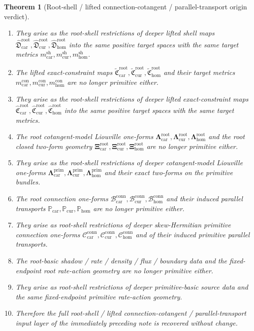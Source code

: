 \documentclass[11pt]{article}
\newcommand{\TensorShellMetric}{m_{\mathrm{car}}^{\mathrm{sh}}}
\newcommand{\CurShellMetric}{m_{\mathrm{cur}}^{\mathrm{sh}}}
\newcommand{\HomShellMetric}{m_{\mathrm{hom}}^{\mathrm{sh}}}
\newcommand{\TensorConstraintMetric}{m_{\mathrm{car}}^{\mathrm{con}}}
\newcommand{\CurConstraintMetric}{m_{\mathrm{cur}}^{\mathrm{con}}}
\newcommand{\HomConstraintMetric}{m_{\mathrm{hom}}^{\mathrm{con}}}
\newcommand{\TensorRootConstraintMap}{\widetilde{\mathfrak C}_{\mathrm{car}}^{\mathrm{root}}}
\newcommand{\CurRootConstraintMap}{\widetilde{\mathfrak C}_{\mathrm{cur}}^{\mathrm{root}}}
\newcommand{\HomRootConstraintMap}{\widetilde{\mathfrak C}_{\mathrm{hom}}^{\mathrm{root}}}
\newcommand{\TensorRootLiouville}{\boldsymbol{\Lambda}_{\mathrm{car}}^{\mathrm{root}}}
\newcommand{\CurRootLiouville}{\boldsymbol{\Lambda}_{\mathrm{cur}}^{\mathrm{root}}}
\newcommand{\HomRootLiouville}{\boldsymbol{\Lambda}_{\mathrm{hom}}^{\mathrm{root}}}
\newcommand{\TensorRootTwo}{\boldsymbol{\Xi}_{\mathrm{car}}^{\mathrm{root}}}
\newcommand{\CurRootTwo}{\boldsymbol{\Xi}_{\mathrm{cur}}^{\mathrm{root}}}
\newcommand{\HomRootTwo}{\boldsymbol{\Xi}_{\mathrm{hom}}^{\mathrm{root}}}
\newcommand{\TensorRootConnectionForm}{\mathcal B_{\mathrm{car}}^{\mathrm{conn}}}
\newcommand{\CurRootConnectionForm}{\mathcal B_{\mathrm{cur}}^{\mathrm{conn}}}
\newcommand{\HomRootConnectionForm}{\mathcal B_{\mathrm{hom}}^{\mathrm{conn}}}
\newcommand{\TensorRootTransport}{\mathbb P_{\mathrm{car}}}
\newcommand{\CurRootTransport}{\mathbb P_{\mathrm{cur}}}
\newcommand{\HomRootTransport}{\mathbb P_{\mathrm{hom}}}
\newcommand{\TensorPrimitiveLiftedShellSection}{\widehat{\mathfrak D}_{\mathrm{car}}^{\mathrm{root}}}
\newcommand{\CurPrimitiveLiftedShellSection}{\widehat{\mathfrak D}_{\mathrm{cur}}^{\mathrm{root}}}
\newcommand{\HomPrimitiveLiftedShellSection}{\widehat{\mathfrak D}_{\mathrm{hom}}^{\mathrm{root}}}
\newcommand{\TensorPrimitiveConstraintMap}{\widehat{\mathfrak C}_{\mathrm{car}}^{\mathrm{root}}}
\newcommand{\CurPrimitiveConstraintMap}{\widehat{\mathfrak C}_{\mathrm{cur}}^{\mathrm{root}}}
\newcommand{\HomPrimitiveConstraintMap}{\widehat{\mathfrak C}_{\mathrm{hom}}^{\mathrm{root}}}
\newcommand{\TensorPrimitiveLiouville}{\boldsymbol{\Lambda}_{\mathrm{car}}^{\mathrm{prim}}}
\newcommand{\CurPrimitiveLiouville}{\boldsymbol{\Lambda}_{\mathrm{cur}}^{\mathrm{prim}}}
\newcommand{\HomPrimitiveLiouville}{\boldsymbol{\Lambda}_{\mathrm{hom}}^{\mathrm{prim}}}
\newcommand{\TensorPrimitiveConnectionForm}{\mathcal C_{\mathrm{car}}^{\mathrm{conn}}}
\newcommand{\CurPrimitiveConnectionForm}{\mathcal C_{\mathrm{cur}}^{\mathrm{conn}}}
\newcommand{\HomPrimitiveConnectionForm}{\mathcal C_{\mathrm{hom}}^{\mathrm{conn}}}
\newtheorem{theorem}{Theorem}
\begin{document}
\begin{theorem}[Root-shell / lifted connection-cotangent / parallel-transport origin verdict]
\begin{enumerate}
    \item They arise as the root-shell restrictions of deeper lifted shell maps \(\TensorPrimitiveLiftedShellSection,\CurPrimitiveLiftedShellSection,\HomPrimitiveLiftedShellSection\) into the same positive target spaces with the same target metrics \(\TensorShellMetric,\CurShellMetric,\HomShellMetric\).
    \item The lifted exact-constraint maps \(\TensorRootConstraintMap,\CurRootConstraintMap,\HomRootConstraintMap\) and their target metrics \(\TensorConstraintMetric,\CurConstraintMetric,\HomConstraintMetric\) are no longer primitive either.
    \item They arise as the root-shell restrictions of deeper lifted exact-constraint maps \(\TensorPrimitiveConstraintMap,\CurPrimitiveConstraintMap,\HomPrimitiveConstraintMap\) into the same positive target spaces with the same target metrics.
    \item The root cotangent-model Liouville one-forms \(\TensorRootLiouville,\CurRootLiouville,\HomRootLiouville\) and the root closed two-form geometry \(\TensorRootTwo,\CurRootTwo,\HomRootTwo\) are no longer primitive either.
    \item They arise as the root-shell restrictions of deeper cotangent-model Liouville one-forms \(\TensorPrimitiveLiouville,\CurPrimitiveLiouville,\HomPrimitiveLiouville\) and their exact two-forms on the primitive bundles.
    \item The root connection one-forms \(\TensorRootConnectionForm,\CurRootConnectionForm,\HomRootConnectionForm\) and their induced parallel transports \(\TensorRootTransport,\CurRootTransport,\HomRootTransport\) are no longer primitive either.
    \item They arise as root-shell restrictions of deeper skew-Hermitian primitive connection one-forms \(\TensorPrimitiveConnectionForm,\CurPrimitiveConnectionForm,\HomPrimitiveConnectionForm\) and of their induced primitive parallel transports.
    \item The root-basic shadow / rate / density / flux / boundary data and the fixed-endpoint root rate-action geometry are no longer primitive either.
    \item They arise as root-shell restrictions of deeper primitive-basic source data and the same fixed-endpoint primitive rate-action geometry.
    \item Therefore the full root-shell / lifted connection-cotangent / parallel-transport input layer of the immediately preceding note is recovered without change.

\end{enumerate}
\end{theorem}
\end{document}
